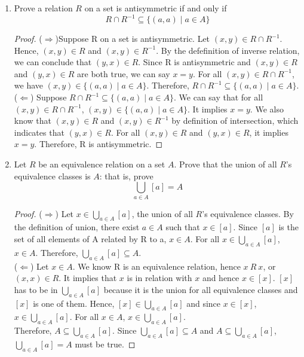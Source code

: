 \documentclass[12pt]{article}
\begin{document}
	\begin{enumerate}
		\item Prove a relation $R$ on a set is antisymmetric if and only if
		\[R\cap R^{-1}\subseteq \{(a,a)\mid a\in A\}\]
		\begin{proof}
			($\Rightarrow$)Suppose R on a set is antisymmetric. Let $(x,y) \in R\cap R^{-1}$. Hence, $(x,y) \in R$ and $(x,y) \in R^{-1}$. By the defefinition of inverse relation, we can conclude that $(y,x) \in R$. Since R is antisymmetric and $(x,y) \in R$ and $(y,x) \in R$ are both true, we can say $x = y$. For all $(x,y) \in R\cap R^{-1}$, we have $(x,y) \in \{ (a,a)\mid a\in A\}$. Therefore, $R\cap R^{-1}\subseteq \{(a,a)\mid a\in A\}$.\\
			($\Leftarrow$) Suppose $R\cap R^{-1}\subseteq \{(a,a)\mid a\in A\}$. We can say that for all $(x,y) \in R\cap R^{-1}$, $(x,y) \in \{(a,a)\mid a\in A\}$. It implies $x=y$. We also know that $(x,y) \in R$ and $(x,y) \in R^{-1}$ by definition of intersection, which indicates that $(y,x) \in R$. For all $(x,y) \in R$ and $(y,x) \in R$, it implies $x=y$. Therefore, R is antisymmetric. 
				
	\end{proof}
		
		\item Let $R$ be an equivalence relation on a set $A$. Prove that the union of all $R$'s equivalence classes is $A$: that is, prove
		\[\bigcup_{a\in A}[a]=A\]
		\begin{proof}
		($\Rightarrow$) Let $x\in \bigcup_{a\in A}[a]$, the union of all $R$'s equivalence classes. By the definition of union, there exist $a \in A$ such that $x \in [a]$. Since $[a]$ is the set of all elements of A related by R to a, $x\in A$. For all $x\in \bigcup_{a\in A}[a]$, $x \in A$. Therefore, $\bigcup_{a\in A}[a] \subseteq A$.\\
		($\Leftarrow$) Let $x \in A$. We know R is an equivalence relation, hence $x \ R \  x$, or $(x,x) \in R$. It implies that $x$ is in relation with $x$ and hence 	$x \in [x]$. $[x]$ has to be in $\bigcup_{a\in A}[a]$ because it is the union for all equivalence classes and $[x]$ is one of them. Hence, $ [x] \in  \bigcup_{a\in A}[a]$ and since 	$x \in [x]$,  $ x \in \bigcup_{a\in A}[a]$. For all $x \in A$, $x\in \bigcup_{a\in A}[a]$.\\
		Therefore, $A \subseteq \bigcup_{a\in A}[a] $. Since $\bigcup_{a\in A}[a] \subseteq A$ and $A \subseteq \bigcup_{a\in A}[a] $, $ \bigcup_{a\in A}[a] = A $ must be true.
		


\end{proof}
\end{enumerate}
\end{document}

